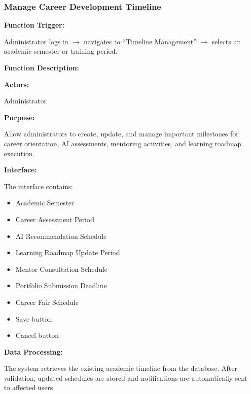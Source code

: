 \subsubsection{Manage Career Development Timeline}

\textbf{Function Trigger:}

Administrator logs in $\rightarrow$ navigates to ``Timeline Management'' $\rightarrow$ selects an academic semester or training period.

\vspace{0.3cm}

\textbf{Function Description:}

\textbf{Actors:}

Administrator

\vspace{0.2cm}

\textbf{Purpose:}

Allow administrators to create, update, and manage important milestones for career orientation, AI assessments, mentoring activities, and learning roadmap execution.

\vspace{0.2cm}

\textbf{Interface:}

The interface contains:

\begin{itemize}
    \item Academic Semester
    \item Career Assessment Period
    \item AI Recommendation Schedule
    \item Learning Roadmap Update Period
    \item Mentor Consultation Schedule
    \item Portfolio Submission Deadline
    \item Career Fair Schedule
    \item Save button
    \item Cancel button
\end{itemize}

\vspace{0.2cm}

\textbf{Data Processing:}

The system retrieves the existing academic timeline from the database. After validation, updated schedules are stored and notifications are automatically sent to affected users.

